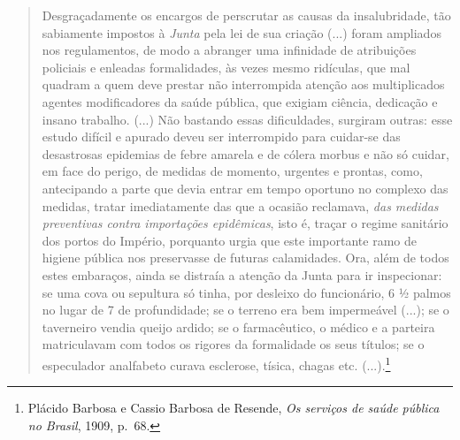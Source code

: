 \begin{quote}
Desgraçadamente os encargos de perscrutar as causas da insalubridade,
tão sabiamente impostos à \emph{Junta} pela lei de sua criação (...)
foram ampliados nos regulamentos, de modo a abranger uma infinidade de
atribuições policiais e enleadas formalidades, às vezes mesmo ridículas,
que mal quadram a quem deve prestar não interrompida atenção aos
multiplicados agentes modificadores da saúde pública, que exigiam
ciência, dedicação e insano trabalho. (...) Não bastando essas
dificuldades, surgiram outras: esse estudo difícil e apurado deveu ser
interrompido para cuidar-se das desastrosas epidemias de febre amarela e
de cólera morbus e não só cuidar, em face do perigo, de medidas de
momento, urgentes e prontas, como, antecipando a parte que devia entrar
em tempo oportuno no complexo das medidas, tratar imediatamente das que
a ocasião reclamava, \emph{das medidas preventivas contra importações
epidêmicas}, isto é, traçar o regime sanitário dos portos do Império,
porquanto urgia que este importante ramo de higiene pública nos
preservasse de futuras calamidades. Ora, além de todos estes embaraços,
ainda se distraía a atenção da Junta para ir inspecionar: se uma cova ou
sepultura só tinha, por desleixo do funcionário, 6 ½ palmos no lugar de
7 de profundidade; se o terreno era bem impermeável (...); se o
taverneiro vendia queijo ardido; se o farmacêutico, o médico e a
parteira matriculavam com todos os rigores da formalidade os seus
títulos; se o especulador analfabeto curava esclerose, tísica, chagas
etc. (...).\footnote{Plácido Barbosa e Cassio Barbosa de Resende,
  \emph{Os serviços de saúde pública no Brasil}, 1909, p.~68.}
\end{quote}

